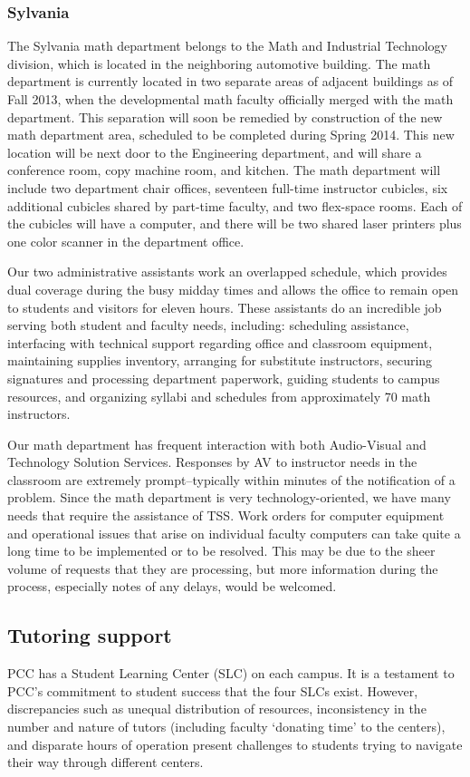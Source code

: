 \subsubsection{Sylvania}
The Sylvania math department belongs to the Math and Industrial Technology division, which is located in the neighboring automotive building.  The math department is currently located in two separate areas of adjacent buildings as of Fall 2013, when the developmental math faculty officially merged with the math department.  This separation will soon be remedied by construction of the new math department area, scheduled to be completed during Spring 2014.  This new location will be next door to the Engineering department, and will share a conference room, copy machine room, and kitchen. The math department will include two department chair offices, seventeen full-time instructor cubicles, six additional cubicles shared by part-time faculty, and two flex-space rooms. Each of the cubicles will have a computer, and there will be two shared laser printers plus one color scanner in the department office.

 Our two administrative assistants work an overlapped schedule, which provides dual coverage during the busy midday times and allows the office to remain open to students and visitors for eleven hours.  These assistants do an incredible job serving both student and faculty needs, including:  scheduling assistance, interfacing with technical support regarding office and classroom equipment, maintaining supplies inventory, arranging for substitute instructors, securing signatures and processing department paperwork, guiding students to campus resources, and organizing syllabi and schedules from approximately 70 math instructors.  

Our math department has frequent interaction with both Audio-Visual and Technology Solution Services.  Responses by AV to instructor needs in the classroom are extremely prompt--typically within minutes of the notification of a problem.  Since the math department is very technology-oriented, we have many needs that require the assistance of TSS.  Work orders for computer equipment and operational issues that arise on individual faculty computers can take quite a long time to be implemented or to be resolved.  This may be due to the sheer volume of requests that they are processing, but more information during the process, especially notes of any delays, would be welcomed.

\subsection{Tutoring support}
PCC has a Student Learning Center (SLC) on each campus.  It is a 
testament to PCC's commitment to student success that the four SLCs exist. However, discrepancies such as unequal distribution of resources, inconsistency 
in the number and nature of tutors (including faculty `donating time' to the centers), and disparate hours
of operation present challenges to students trying to navigate their way through different centers.

